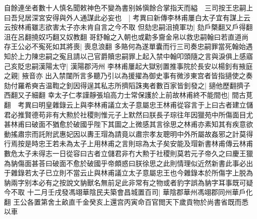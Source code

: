 自餘連坐者數十人慎名聞敕神色不變為書别姊愼餘合掌指天而縊　三司按王忠嗣上曰吾兒居深宮安得與外人通謀此必妄也　|{
	考異曰新傳李林甫屢白太子宜有謀上云云按林甫雖志欲害太子亦未肯自言之今不取}
但劾忠嗣沮撓軍功|{
	劾戶槩翻又戶得翻沮在呂翻撓奴巧翻又奴教翻}
哥舒翰之入朝也或勸多齎金帛以救忠嗣翰曰若直道尚存王公必不寃死如其將喪|{
	喪息浪翻}
多賂何為遂單囊而行三司奏忠嗣罪當死翰始遇知於上力陳忠嗣之寃且請以己官爵贖忠嗣罪上起入禁中翰叩頭隨之言與淚俱上感寤己亥貶忠嗣漢陽太守|{
	漢陽郡沔州}
李林甫屢起大獄别置推事院於長安以楊釗有掖庭之親|{
	掖音亦}
出入禁闥所言多聽乃引以為援擢為御史事有微涉東宫者皆指擿使之奏劾付羅希奭吉温鞫之釗因得逞其私志所擠䧟誅夷者數百家皆釗發之|{
	擿他歷翻擠子西翻又子細翻}
幸太子仁孝謹靜張垍高力士常保護於上前故林甫終不能間也|{
	間古莧翻　考異曰明皇雜錄云上與李林甫議立太子意屬忠王林甫從容言于上曰古者建立儲君必推賢德苟非有大勲於社稷則惟元子上默然曰朕長子琮往年因獵苑中所傷面目尤甚林甫曰破面不猶愈於破國乎陛下其圖之上微感其言徐思之林甫亦素知其有疾意欲動搖肅宗而託附武惠妃因以夀王瑁為請竟以肅宗孝友聰明中外所屬故姦邪之計莫得行焉按是時忠王若未為太子上用林甫之言則琮為太子矣安能及瑁新書林甫傳云林甫數危太子未得志一日從容曰古者立儲君非冇大勲于社稷則莫若元子帝久之曰慶王獵為豽傷面甚荅曰破面不愈於破國乎帝頗惑曰朕徐思之此則情理似近然新書此事必出于雜錄若太子已立則不當云止與林甫議立太子意屬忠王也今雜錄本於所傷字上脱為豽兩字别本必有之按說文豽獸名無前足此非常有之物或者豹字誤為豽字耳事既可疑今不取}
十二月壬戌發馮翊華陰民夫築會昌城置百司|{
	華陰郡華州馮翊郡同州華戶化翻}
王公各置第舍土畝直千金癸亥上還宫丙寅命百官閲天下歲貢物於尚書省既而悉以車


